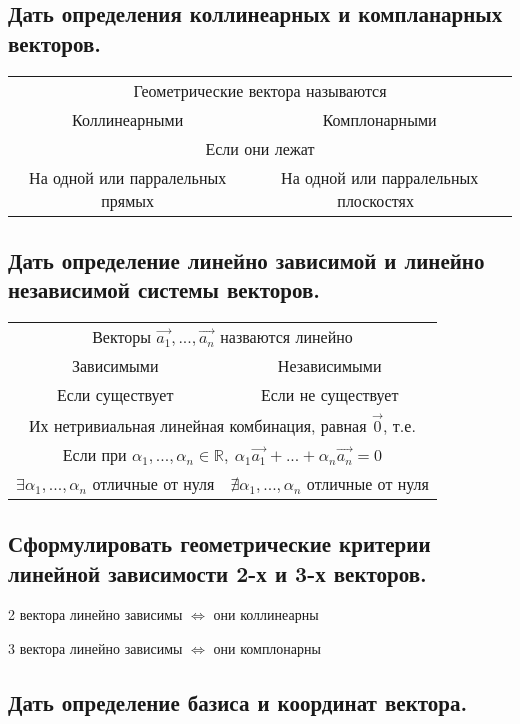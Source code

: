 \documentclass[a4paper, 10pt]{article}
\newcommand{\mcol}[1]{\multicolumn{2}{c}{#1}}
\begin{document}
\subsection{Дать определения коллинеарных и компланарных векторов.}

\begin{center}
\begin{tabular}{c c} 
    \mcol{Геометрические вектора называются}\\
    Коллинеарными & Комплонарными\\
    \mcol{Если они лежат }\\
    На одной или парралельных прямых & На одной или парралельных плоскостях \\
\end{tabular}
\end{center}

\subsection{Дать определение линейно зависимой и линейно независимой системы векторов.}

\begin{center}
\begin{tabular}{c c} 
    \mcol{Векторы $\vec{a_1},...,\vec{a_n}$ назваются линейно}\\
    Зависимыми & Независимыми\\
    Если существует & Если не существует\\
    \mcol{Их нетривиальная линейная комбинация, равная $\vec{0}$, т.е.}\\
    \mcol{Если при $\alpha_1,...,\alpha_n \in \mathbb{R}, \ \alpha_1 \vec{a_1} +...+ \alpha_n \vec{a_n} = 0$ }\\
    $\exists \alpha_1,...,\alpha_n$ отличные от нуля & $\nexists \alpha_1,...,\alpha_n$ отличные от нуля \\
\end{tabular}
\end{center}

\subsection{Сформулировать геометрические критерии линейной зависимости 2-х и 3-х векторов.}

2 вектора линейно зависимы $\iff$ они коллинеарны

3 вектора линейно зависимы $\iff$ они комплонарны

\subsection{Дать определение базиса и координат вектора.}
\end{document}
